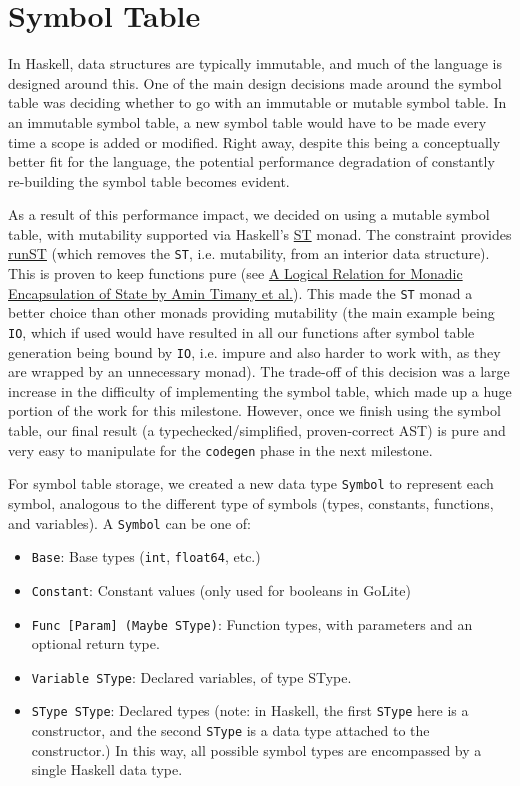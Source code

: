\documentclass[11pt]{article}
\begin{document}
\section{Symbol Table}
\label{sec:org949e50d}
In Haskell, data structures are typically immutable, and much of the
language is designed around this. One of the main design decisions
made around the symbol table was deciding whether to go with an
immutable or mutable symbol table. In an immutable symbol table, a
new symbol table would have to be made every time a scope is added
or modified. Right away, despite this being a conceptually better
fit for the language, the potential performance degradation of
constantly re-building the symbol table becomes evident.

As a result of this performance impact, we decided on using a
mutable symbol table, with mutability supported via Haskell's
\href{https://hackage.haskell.org/package/base-4.12.0.0/docs/Control-Monad-ST.html}{ST}
monad. The constraint provides
\href{https://hackage.haskell.org/package/base-4.12.0.0/docs/Control-Monad-ST.html\#v:runST}{runST}
(which removes the \texttt{ST}, i.e.  mutability, from an interior data
structure). This is proven to keep functions pure (see
\href{https://iris-project.org/pdfs/2018-popl-runST-final.pdf}{A Logical
Relation for Monadic Encapsulation of State by Amin Timany et
al.}). This made the \texttt{ST} monad a better choice than other monads
providing mutability (the main example being \texttt{IO}, which if used
would have resulted in all our functions after symbol table
generation being bound by \texttt{IO}, i.e. impure and also harder to work
with, as they are wrapped by an unnecessary monad). The trade-off of
this decision was a large increase in the difficulty of implementing
the symbol table, which made up a huge portion of the work for this
milestone.  However, once we finish using the symbol table, our
final result (a typechecked/simplified, proven-correct AST) is pure
and very easy to manipulate for the \texttt{codegen} phase in the next
milestone.

For symbol table storage, we created a new data type \texttt{Symbol} to
represent each symbol, analogous to the different type of symbols
(types, constants, functions, and variables). A \texttt{Symbol} can be one
of:
\begin{itemize}
\item \texttt{Base}: Base types (\texttt{int}, \texttt{float64}, etc.)
\item \texttt{Constant}: Constant values (only used for booleans in GoLite)
\item \texttt{Func [Param] (Maybe SType)}: Function types, with parameters and an
optional return type.
\item \texttt{Variable SType}: Declared variables, of type SType.
\item \texttt{SType SType}: Declared types (note: in Haskell, the first \texttt{SType} here is
a constructor, and the second \texttt{SType} is a data type attached to
the constructor.)  In this way, all possible symbol types are
encompassed by a single Haskell data type.
\end{itemize}
\end{document}

